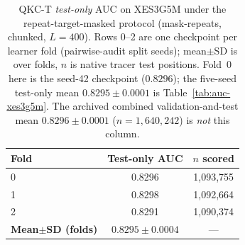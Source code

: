 \begin{table}[H]
\caption{QKC-T \emph{test-only} AUC on XES3G5M under the repeat-target-masked protocol
(mask-repeats, chunked, $L{=}400$).
Rows 0--2 are one checkpoint per learner fold (pairwise-audit split seeds);
mean$\pm$SD is over folds, $n$ is native tracer test positions.
Fold~0 here is the seed-42 checkpoint ($0.8296$); the five-seed
test-only mean $0.8295{\pm}0.0001$ is Table~\ref{tab:auc-xes3g5m}.
The archived combined validation-and-test mean $0.8296{\pm}0.0001$
($n{=}1{,}640{,}242$) is \emph{not} this column.}
\label{tab:auc-p0-dt-folds}
\centering
\begin{tabular}{@{}lcc@{}}
\toprule
Fold & Test-only AUC & $n$ scored \\
\midrule
0 & 0.8296 & 1{,}093{,}755 \\
1 & 0.8298 & 1{,}092{,}664 \\
2 & 0.8291 & 1{,}090{,}374 \\
\textbf{Mean$\pm$SD (folds)} & $\mathbf{0.8295{\pm}0.0004}$ & --- \\
\bottomrule
\end{tabular}
\end{table}

